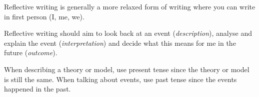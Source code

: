 Reflective writing is generally a more relaxed form of writing where you can write in first person (I, me, we).

Reflective writing should aim to look back at an event (\emph{description}), analyse and explain the event (\emph{interpretation}) and decide what this means for me in the future (\emph{outcome}).

\begin{note}
    When describing a theory or model, use present tense since the theory or model is still the same.
    When talking about events, use past tense since the events happened in the past.
\end{note}


